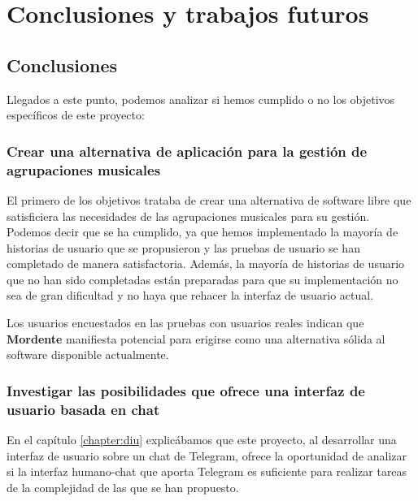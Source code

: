 \chapter{Conclusiones y trabajos futuros}

\section{Conclusiones}



Llegados a este punto, podemos analizar si hemos cumplido o no los objetivos específicos de este proyecto:

\subsection{Crear una alternativa de aplicación para la gestión de agrupaciones musicales}

El primero de los objetivos trataba de crear una alternativa de software libre que satisficiera las necesidades de las agrupaciones musicales para su gestión. Podemos decir que se ha cumplido, ya que hemos implementado la mayoría de historias de usuario que se propusieron y las pruebas de usuario se han completado de manera satisfactoria. Además, la mayoría de historias de usuario que no han sido completadas están preparadas para que su implementación no sea de gran dificultad y no haya que rehacer la interfaz de usuario actual.

Los usuarios encuestados en las pruebas con usuarios reales indican que \textbf{Mordente} manifiesta potencial para erigirse como una alternativa sólida al software disponible actualmente.

\subsection{Investigar las posibilidades que ofrece una interfaz de usuario basada en chat}\label{subsection:investigarInterfazChat}

En el capítulo \ref{chapter:diu} explicábamos que este proyecto, al desarrollar una interfaz de usuario sobre un chat de Telegram, ofrece la oportunidad de analizar si la interfaz humano-chat que aporta Telegram es suficiente para realizar tareas de la complejidad de las que se han propuesto.

